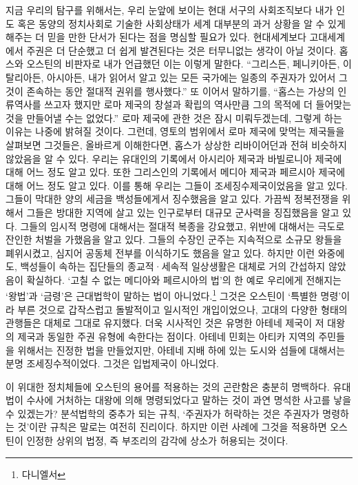 지금 우리의 탐구를 위해서는,
우리 눈앞에 보이는 현대 서구의 사회조직보다
내가 인도 혹은 동양의 정치사회로 기술한 사회상태가
세계 대부분의 과거 상황을 알 수 있게 해주는 더 믿을 만한 단서가 된다는 점을
명심할 필요가 있다.
현대세계보다 고대세계에서 주권은 더 단순했고 더 쉽게 발견된다는 것은
터무니없는 생각이 아닐 것이다.
홉스와 오스틴의 비판자로 내가 언급했던 이는 이렇게 말한다.
``그리스든, 페니키아든, 이탈리아든, 아시아든,
내가 읽어서 알고 있는 모든 국가에는
일종의 주권자가 있어서 그것이 존속하는 동안 절대적 권위를 행사했다.''
또 이어서 말하기를,
``홉스는 가상의 인류역사를 쓰고자 했지만
로마 제국의 창설과 확립의 역사만큼 그의 목적에 더 들어맞는 것을
만들어낼 수는 없었다.''
로마 제국에 관한 것은 잠시 미뤄두겠는데,
그렇게 하는 이유는 나중에 밝혀질 것이다.
그런데,
영토의 범위에서 로마 제국에 맞먹는 제국들을 살펴보면
그것들은, 올바르게 이해한다면,
홉스가 상상한 리바이어던과 전혀 비슷하지 않았음을
알 수 있다.
우리는 유대인의 기록에서 아시리아 제국과 바빌로니아 제국에 대해
어느 정도 알고 있다.
또한 그리스인의 기록에서 메디아 제국과 페르시아 제국에 대해
어느 정도 알고 있다.
이를 통해 우리는 그들이 조세징수제국이었음을 알고 있다.
그들이 막대한 양의 세금을 백성들에게서 징수했음을 알고 있다.
가끔씩 정복전쟁을 위해서 그들은 방대한 지역에 살고 있는 인구로부터
대규모 군사력을 징집했음을 알고 있다.
그들의 임시적 명령에 대해서는 절대적 복종을 강요했고, 위반에 대해서는
극도로 잔인한 처벌을 가했음을 알고 있다.
그들의 수장인 군주는 지속적으로 소규모 왕들을 폐위시켰고,
심지어 공동체 전부를 이식하기도 했음을 알고 있다.
하지만 이런 와중에도,
백성들이 속하는 집단들의 종교적·세속적 일상생활은
대체로 거의 간섭하지 않았음이 확실하다.
`고칠 수 없는 메디아와 페르시아의 법'의 한 예로
우리에게 전해지는 `왕법'과 `금령'은
근대법학이 말하는 법이 아니었다.\footnote{다니엘서  }
그것은 오스틴이 `특별한 명령'이라 부른 것으로
갑작스럽고 돌발적이고 일시적인 개입이었으나,
고대의 다양한 형태의 관행들은 대체로 그대로 유지했다.
더욱 시사적인 것은
유명한 아테네 제국이
저 대왕의 제국과 동일한 주권 유형에 속한다는 점이다.
아테네 민회는 아티카 지역의 주민들을 위해서는 진정한 법을 만들었지만,
아테네 지배 하에 있는 도시와 섬들에 대해서는 분명
조세징수적이었다.
그것은 입법제국이 아니었다.

이 위대한 정치체들에 오스틴의 용어를 적용하는 것의 곤란함은 충분히 명백하다.
유대법이 수사에 거처하는 대왕에 의해 명령되었다고 말하는 것이
과연 명석한 사고를 낳을 수 있겠는가?
분석법학의 중추가 되는 규칙, `주권자가 허락하는 것은 주권자가 명령하는 것'이란
규칙은 말로는 여전히 진리이다.
하지만 이런 사례에 그것을 적용하면
오스틴이 인정한 상위의 법정, 즉 부조리의 감각에 상소가 허용되는 것이다.

